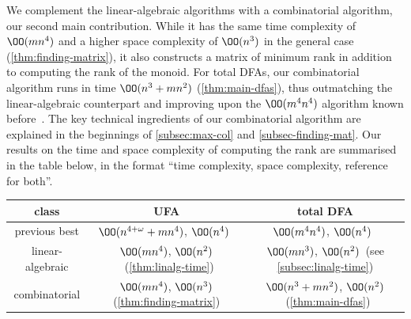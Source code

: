 We complement the linear-algebraic algorithms with a combinatorial algorithm, our second main contribution. While it has the same time complexity of  $\OO(mn^4)$ and a higher space complexity of $\OO(n^3)$ in the general case (\autoref{thm:finding-matrix}), it also constructs a matrix of minimum rank in addition to computing the rank of the monoid. For total DFAs, our combinatorial algorithm runs in time $\OO(n^3 + mn^2)$ (\autoref{thm:main-dfas}), thus outmatching the linear-algebraic counterpart and improving upon the $\OO(m^4n^4)$ algorithm known before~\cite{Rystsov1992Rank}. The key technical ingredients of our combinatorial algorithm are explained in the beginnings of \autoref{subsec:max-col} and \autoref{subsec-finding-mat}.
Our results on the time and space complexity of computing the rank are summarised in the table below, in the format ``time complexity, space complexity, reference for both''.

\begin{center}
\begin{tabular}{ccc}
  \toprule
  class & UFA & total DFA \\
  \midrule
  previous best & $\OO(n^{4 + \omega} + mn^4)$, $\OO(n^4)$~\cite{Carpi1988} & $\OO(m^4n^4)$, $\OO(n^4)$~\cite{Rystsov1992Rank} \\
  linear-algebraic & $\OO(mn^4)$,  $\OO(n^2)$~(\autoref{thm:linalg-time}) & $\OO(mn^3)$, $\OO(n^2)$~(see \autoref{subsec:linalg-time}) \\
  combinatorial & $\OO( mn^4)$, $\OO(n^3)$ (\autoref{thm:finding-matrix}) & $\OO(n^3 + mn^2)$, $\OO(n^2)$~(\autoref{thm:main-dfas}) \\
  \bottomrule
\end{tabular}
\end{center}